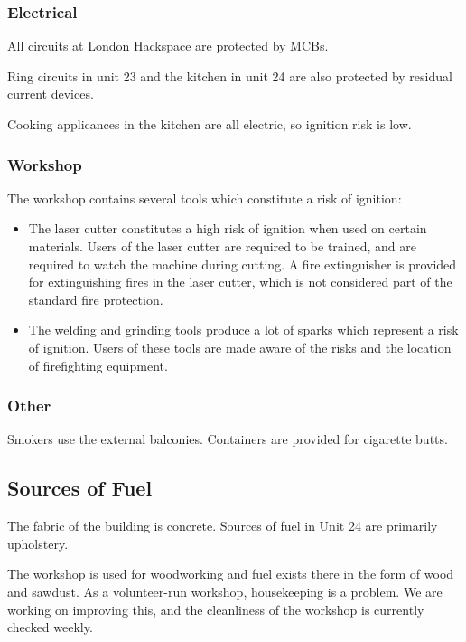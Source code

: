 \subsubsection{Electrical}

All circuits at London Hackspace are protected by MCBs.

Ring circuits in unit 23 and the kitchen in unit 24 are also protected
by residual current devices.

Cooking applicances in the kitchen are all electric, so ignition risk is
low.

\subsubsection{Workshop}

The workshop contains several tools which constitute a risk of ignition:

\begin{itemize}
\item
  The laser cutter constitutes a high risk of ignition when used on
  certain materials. Users of the laser cutter are required to be
  trained, and are required to watch the machine during cutting. A \COtwo
  fire extinguisher is provided for extinguishing fires in the laser
  cutter, which is not considered part of the standard fire protection.
\item
  The welding and grinding tools produce a lot of sparks which represent
  a risk of ignition. Users of these tools are made aware of the risks
  and the location of firefighting equipment.
\end{itemize}
\subsubsection{Other}

Smokers use the external balconies. Containers are provided for
cigarette butts.

\subsection{Sources of Fuel}

The fabric of the building is concrete. Sources of fuel in Unit 24 are
primarily upholstery.

The workshop is used for woodworking and fuel exists there in the form
of wood and sawdust. As a volunteer-run workshop, housekeeping is a
problem. We are working on improving this, and the cleanliness of the
workshop is currently checked weekly.

